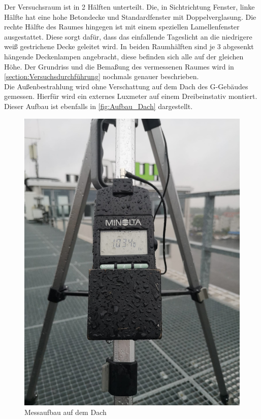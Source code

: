 Der Versuchsraum ist in 2 Hälften unterteilt. Die, in Sichtrichtung Fenster, linke Hälfte
hat eine hohe Betondecke und Standardfenster mit Doppelverglasung.
Die rechte Hälfte des Raumes hingegen ist mit einem speziellen Lamellenfenster
ausgestattet. Diese sorgt dafür, dass das einfallende Tageslicht an die niedrigere
weiß gestrichene Decke geleitet wird. In beiden Raumhälften sind je 3 abgesenkt
hängende Deckenlampen angebracht, diese befinden sich alle auf der gleichen Höhe.
Der Grundriss und die Bemaßung des vermessenen Raumes wird in \autoref{section:Versuchsdurchführung} nochmals genauer
beschrieben.\\
Die Außenbestrahlung wird ohne Verschattung auf dem Dach des G-Gebäudes gemessen.
Hierfür wird ein externes Luxmeter auf einem Dreibeinstativ montiert.
Dieser Aufbau ist ebenfalls in \autoref{fig:Aufbau_Dach} dargestellt.


\begin{figure}[H]
    \centering
    \includegraphics[scale=0.15]{Abbildungen/Aufbau-Dach.jpg}
    \caption{Messaufbau auf dem Dach}
    \label{fig:Aufbau_Dach}
\end{figure}

